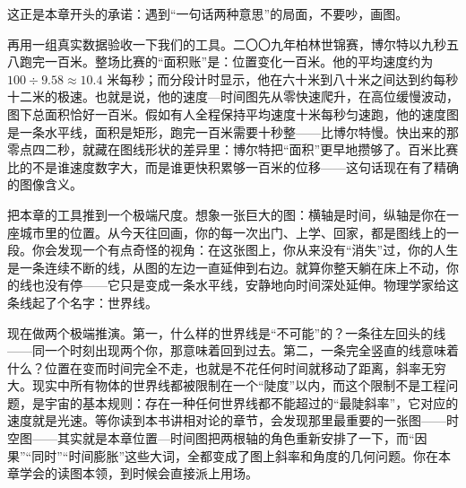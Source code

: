 这正是本章开头的承诺：遇到“一句话两种意思”的局面，不要吵，画图。

再用一组真实数据验收一下我们的工具。二〇〇九年柏林世锦赛，博尔特以九秒五八跑完一百米。整场比赛的“面积账”是：位置变化一百米。他的平均速度约为 \(100\div 9.58\approx 10.4\) 米每秒；而分段计时显示，他在六十米到八十米之间达到约每秒十二米的极速。也就是说，他的速度—时间图先从零快速爬升，在高位缓慢波动，图下总面积恰好一百米。假如有人全程保持平均速度十米每秒匀速跑，他的速度图是一条水平线，面积是矩形，跑完一百米需要十秒整——比博尔特慢。快出来的那零点四二秒，就藏在图线形状的差异里：博尔特把“面积”更早地攒够了。百米比赛比的不是谁速度数字大，而是谁更快积累够一百米的位移——这句话现在有了精确的图像含义。


\begin{thought}[你的人生是一条线]
把本章的工具推到一个极端尺度。想象一张巨大的图：横轴是时间，纵轴是你在一座城市里的位置。从今天往回画，你的每一次出门、上学、回家，都是图线上的一段。你会发现一个有点奇怪的视角：在这张图上，你从来没有“消失”过，你的人生是一条连续不断的线，从图的左边一直延伸到右边。就算你整天躺在床上不动，你的线也没有停——它只是变成一条水平线，安静地向时间深处延伸。物理学家给这条线起了个名字：世界线。

现在做两个极端推演。第一，什么样的世界线是“不可能”的？一条往左回头的线——同一个时刻出现两个你，那意味着回到过去。第二，一条完全竖直的线意味着什么？位置在变而时间完全不走，也就是不花任何时间就移动了距离，斜率无穷大。现实中所有物体的世界线都被限制在一个“陡度”以内，而这个限制不是工程问题，是宇宙的基本规则：存在一种任何世界线都不能超过的“最陡斜率”，它对应的速度就是光速。等你读到本书讲相对论的章节，会发现那里最重要的一张图——时空图——其实就是本章位置—时间图把两根轴的角色重新安排了一下，而“因果”“同时”“时间膨胀”这些大词，全都变成了图上斜率和角度的几何问题。你在本章学会的读图本领，到时候会直接派上用场。
\end{thought}

